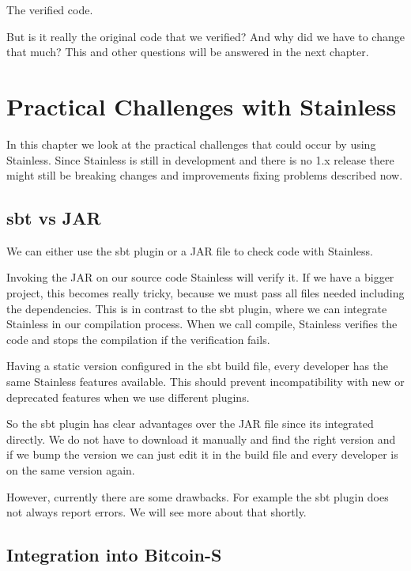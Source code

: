 \documentclass[runningheads]{llncs}
\begin{document}
The verified code.


But is it really the original code that we verified?
And why did we have to change that much?
This and other questions will be answered in the next chapter.


\section{Practical Challenges with Stainless}
\label{chap:appendix_arb}

In this chapter we look at the practical challenges that could occur
by using Stainless.  Since Stainless is still in development and there
is no 1.x release there might still be breaking changes and
improvements fixing problems described now.


\subsection{sbt vs JAR}

We can either use the sbt plugin or a JAR file to check code with Stainless.

Invoking the JAR on our source code Stainless will verify it.  If we
have a bigger project, this becomes really tricky, because we must
pass all files needed including the dependencies.  This is in contrast
to the sbt plugin, where we can integrate Stainless in our compilation
process.  When we call compile, Stainless verifies the code and stops
the compilation if the verification fails.

Having a static version configured in the sbt build file, every
developer has the same Stainless features available.  This should
prevent incompatibility with new or deprecated features when we use
different plugins.

So the sbt plugin has clear advantages over the JAR file since its
integrated directly.  We do not have to download it manually and find
the right version and if we bump the version we can just edit it in
the build file and every developer is on the same version again.

However, currently there are some drawbacks.  For example the sbt
plugin does not always report errors.  We will see more about that
shortly.


\subsection{Integration into Bitcoin-S}
\end{document}

